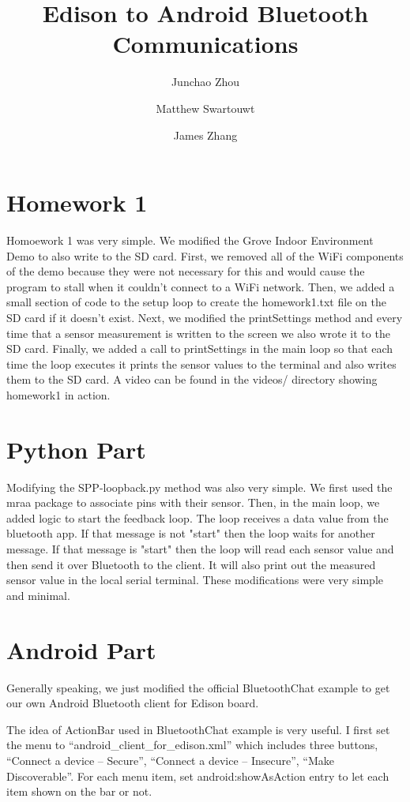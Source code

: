 \documentclass[]{article}
\title{Edison to Android Bluetooth Communications}
\author{Junchao Zhou \and Matthew Swartouwt \and James Zhang}
\begin{document}
\maketitle

\section{Homework 1}
Homoework 1 was very simple. We modified the Grove Indoor Environment Demo to also write to the SD card. First, we removed all of the WiFi components of the demo because they were not necessary for this and would cause the program to stall when it couldn't connect to a WiFi network. Then, we added a small section of code to the setup loop to create the homework1.txt file on the SD card if it doesn't exist. Next, we modified the printSettings method and every time that a sensor measurement is written to the screen we also wrote it to the SD card. Finally, we added a call to printSettings in the main loop so that each time the loop executes it prints the sensor values to the terminal and also writes them to the SD card. A video can be found in the videos/ directory showing homework1 in action.
 
\section{Python Part}
Modifying the SPP-loopback.py method was also very simple. We first used the mraa package to associate pins with their sensor. Then, in the main loop, we added logic to start the feedback loop. The loop receives a data value from the bluetooth app. If that message is not "start" then the loop waits for another message. If that message is "start" then the loop will read each sensor value and then send it over Bluetooth to the client. It will also print out the measured sensor value in the local serial terminal. These modifications were very simple and minimal. 

\section{Android Part}
Generally speaking, we just modified the official BluetoothChat example to get our own Android Bluetooth client for Edison board. 

The idea of ActionBar used in BluetoothChat example is very useful. I first set the menu to “android\_client\_for\_edison.xml” which includes three buttons, “Connect a device – Secure”, “Connect a device – Insecure”, “Make Discoverable”. For each menu item, set android:showAsAction entry to let each item shown on the bar or not.
 
\end{document}
